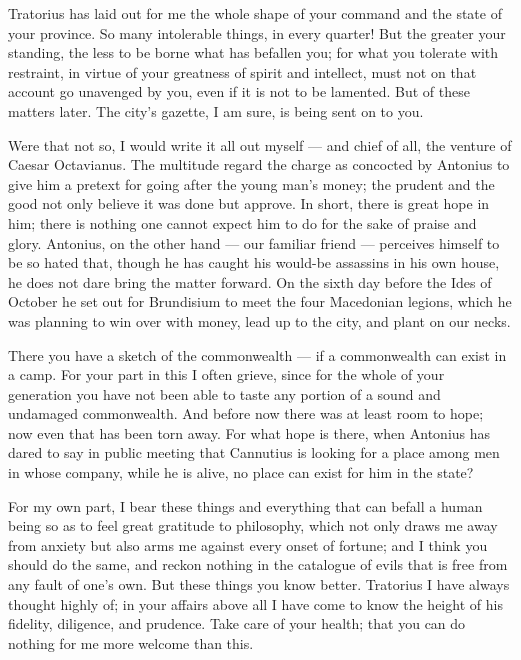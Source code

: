 

 Tratorius has laid out for me the whole shape of your command and the state of your province. So many intolerable things, in every quarter! But the greater your standing, the less to be borne what has befallen you; for what you tolerate with restraint, in virtue of your greatness of spirit and intellect, must not on that account go unavenged by you, even if it is not to be lamented. But of these matters later. The city's gazette, I am sure, is being sent on to you.

 Were that not so, I would write it all out myself --- and chief of all, the venture of Caesar Octavianus. The multitude regard the charge as concocted by Antonius to give him a pretext for going after the young man's money; the prudent and the good not only believe it was done but approve. In short, there is great hope in him; there is nothing one cannot expect him to do for the sake of praise and glory. Antonius, on the other hand --- our familiar friend --- perceives himself to be so hated that, though he has caught his would-be assassins in his own house, he does not dare bring the matter forward. On the sixth day before the Ides of October he set out for Brundisium to meet the four Macedonian legions, which he was planning to win over with money, lead up to the city, and plant on our necks.

 There you have a sketch of the commonwealth --- if a commonwealth can exist in a camp. For your part in this I often grieve, since for the whole of your generation you have not been able to taste any portion of a sound and undamaged commonwealth. And before now there was at least room to hope; now even that has been torn away. For what hope is there, when Antonius has dared to say in public meeting that Cannutius is looking for a place among men in whose company, while he is alive, no place can exist for him in the state?

 For my own part, I bear these things and everything that can befall a human being so as to feel great gratitude to philosophy, which not only draws me away from anxiety but also arms me against every onset of fortune; and I think you should do the same, and reckon nothing in the catalogue of evils that is free from any fault of one's own. But these things you know better. Tratorius I have always thought highly of; in your affairs above all I have come to know the height of his fidelity, diligence, and prudence. Take care of your health; that you can do nothing for me more welcome than this.
